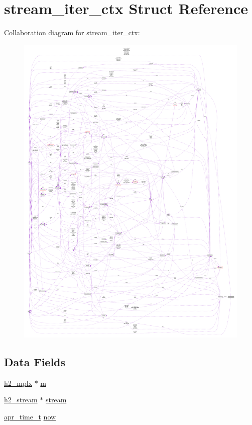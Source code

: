 \hypertarget{structstream__iter__ctx}{}\section{stream\+\_\+iter\+\_\+ctx Struct Reference}
\label{structstream__iter__ctx}


Collaboration diagram for stream\+\_\+iter\+\_\+ctx\+:
\nopagebreak
\begin{figure}[H]
\begin{center}
\leavevmode
\includegraphics[width=350pt]{structstream__iter__ctx__coll__graph}
\end{center}
\end{figure}
\subsection*{Data Fields}
\begin{DoxyCompactItemize}
\item 
\hyperlink{structh2__mplx}{h2\+\_\+mplx} $\ast$ \hyperlink{structstream__iter__ctx_a226d68aae95c6a147dab4b6a05360f07}{m}
\item 
\hyperlink{structh2__stream}{h2\+\_\+stream} $\ast$ \hyperlink{structstream__iter__ctx_a3c57e061b71c85e8d060fbe707a227ee}{stream}
\item 
\hyperlink{group__apr__time_gadb4bde16055748190eae190c55aa02bb}{apr\+\_\+time\+\_\+t} \hyperlink{structstream__iter__ctx_a11d13e9433e07c4fb11553fe60f22f5b}{now}
\end{DoxyCompactItemize}


